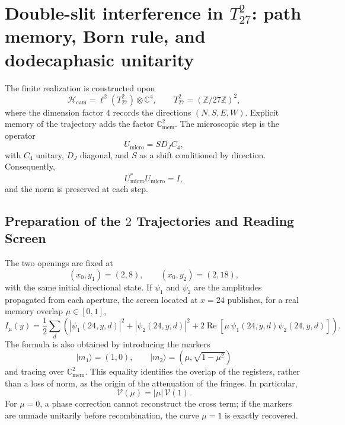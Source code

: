 \section{Double-slit interference in \(T^2_{27}\): path memory, Born rule, and dodecaphasic unitarity}
\label{sec:md-sucesora-interferometria-t27}

The finite realization is constructed upon
\[
 \mathcal H_{\mathrm{cam}}
 =\ell^2\!\left(T_{27}^{2}\right)\otimes\mathbb C^4,
 \qquad
 T_{27}^{2}=(\mathbb Z/27\mathbb Z)^2,
\]
where the dimension factor \(4\) records the directions
\((N,S,E,W)\). Explicit memory of the trajectory adds the factor
\(\mathbb C^2_{\mathrm{mem}}\). The microscopic step is the operator
\begin{equation}
 U_{\mathrm{micro}}=S D_J C_4,
 \label{eq:md-sucesora-interferometro-microstep}
\end{equation}
with \(C_4\) unitary, \(D_J\) diagonal, and \(S\) as a shift conditioned
by direction. Consequently,
\[
 U_{\mathrm{micro}}^*U_{\mathrm{micro}}=I,
\]
and the norm is preserved at each step.

\subsection{Preparation of the \(2\) Trajectories and Reading Screen}

The two openings are fixed at
\[
 (x_0,y_1)=(2,8),
 \qquad
 (x_0,y_2)=(2,18),
\]
with the same initial directional state. If \(\psi_1\) and \(\psi_2\) are the
amplitudes propagated from each aperture, the screen located at \(x=24\)
publishes, for a real memory overlap \(\mu\in[0,1]\),
\begin{equation}
 I_\mu(y)
 =\frac12\sum_d
 \left(
  |\psi_1(24,y,d)|^2+|\psi_2(24,y,d)|^2
  +2\operatorname{Re}\!\left[
   \mu\,\overline{\psi_1(24,y,d)}\psi_2(24,y,d)
  \right]
 \right).
 \label{eq:md-sucesora-interferometro-intensidad}
\end{equation}
The formula is also obtained by introducing the markers
\[
 |m_1\rangle=(1,0),
 \qquad
 |m_2\rangle=(\mu,\sqrt{1-\mu^2})
\]
and tracing over \(\mathbb C^2_{\mathrm{mem}}\). This equality identifies the
overlap of the registers, rather than a loss of norm, as the origin of the
attenuation of the fringes. In particular,
\begin{equation}
 \mathcal V(\mu)=|\mu|\,\mathcal V(1).
 \label{eq:md-sucesora-interferometro-visibilidad}
\end{equation}
For \(\mu=0\), a phase correction cannot reconstruct the cross term;
if the markers are unmade unitarily before recombination, the
curve \(\mu=1\) is exactly recovered.

